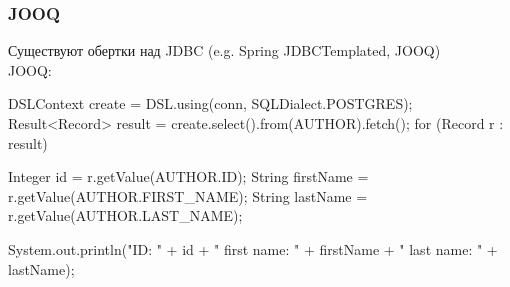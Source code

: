 \documentclass[russian,aspectratio=169,14pt]{beamer}
\begin{document}
\begin{frame}[fragile]
	\frametitle{JOOQ}
	Существуют обертки над JDBC (e.g. Spring JDBCTemplated, JOOQ)\\
	JOOQ:
	\begin{listjava}
DSLContext create = DSL.using(conn, SQLDialect.POSTGRES);
Result<Record> result = create.select().from(AUTHOR).fetch();
for (Record r : result) {
    Integer id = r.getValue(AUTHOR.ID);
    String firstName = r.getValue(AUTHOR.FIRST_NAME);
    String lastName = r.getValue(AUTHOR.LAST_NAME);
    
    System.out.println("ID: " + id + " first name: " +
         firstName + " last name: " + lastName);
}
	\end{listjava}
\end{frame}


\questions
\end{document}
